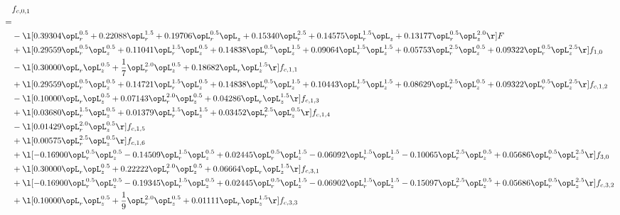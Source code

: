 \begin{alignat}{2} 
\label{eq:f_01_2} 
& f_{c,0,1} \nonumber \\ 
 = \\ 
& - \l[  0.39304 \opL_r^{0.5} +  0.22088 \opL_r^{1.5} +  0.19706 \opL_r^{0.5} \opL_z +  0.15340 \opL_r^{2.5} +  0.14575 \opL_r^{1.5} \opL_z +  0.13177 \opL_r^{0.5} \opL_z^{2.0}  \r] F \nonumber \\ 
& + \l[  0.29559 \opL_r^{0.5} \opL_z^{0.5} +  0.11041 \opL_r^{1.5} \opL_z^{0.5} +  0.14838 \opL_r^{0.5} \opL_z^{1.5} +  0.09064 \opL_r^{1.5} \opL_z^{1.5} +  0.05753 \opL_r^{2.5} \opL_z^{0.5} +  0.09322 \opL_r^{0.5} \opL_z^{2.5}  \r] f_{1,0} \nonumber \\ 
& - \l[  0.30000 \opL_r \opL_z^{0.5} + \frac{1}{7} \opL_r^{2.0} \opL_z^{0.5} +  0.18682 \opL_r \opL_z^{1.5}  \r] f_{c,1,1} \nonumber \\ 
& + \l[  0.29559 \opL_r^{0.5} \opL_z^{0.5} +  0.14721 \opL_r^{1.5} \opL_z^{0.5} +  0.14838 \opL_r^{0.5} \opL_z^{1.5} +  0.10443 \opL_r^{1.5} \opL_z^{1.5} +  0.08629 \opL_r^{2.5} \opL_z^{0.5} +  0.09322 \opL_r^{0.5} \opL_z^{2.5}  \r] f_{c,1,2} \nonumber \\ 
& - \l[  0.10000 \opL_r \opL_z^{0.5} +  0.07143 \opL_r^{2.0} \opL_z^{0.5} +  0.04286 \opL_r \opL_z^{1.5}  \r] f_{c,1,3} \nonumber \\ 
& + \l[  0.03680 \opL_r^{1.5} \opL_z^{0.5} +  0.01379 \opL_r^{1.5} \opL_z^{1.5} +  0.03452 \opL_r^{2.5} \opL_z^{0.5}  \r] f_{c,1,4} \nonumber \\ 
& - \l[  0.01429 \opL_r^{2.0} \opL_z^{0.5}  \r] f_{c,1,5} \nonumber \\ 
& + \l[  0.00575 \opL_r^{2.5} \opL_z^{0.5}  \r] f_{c,1,6} \nonumber \\ 
& + \l[  -0.16900 \opL_r^{0.5} \opL_z^{0.5}   -0.14509 \opL_r^{1.5} \opL_z^{0.5} +  0.02445 \opL_r^{0.5} \opL_z^{1.5}   -0.06092 \opL_r^{1.5} \opL_z^{1.5}   -0.10065 \opL_r^{2.5} \opL_z^{0.5} +  0.05686 \opL_r^{0.5} \opL_z^{2.5}  \r] f_{3,0} \nonumber \\ 
& + \l[  0.30000 \opL_r \opL_z^{0.5} +  0.22222 \opL_r^{2.0} \opL_z^{0.5} +  0.06664 \opL_r \opL_z^{1.5}  \r] f_{c,3,1} \nonumber \\ 
& + \l[  -0.16900 \opL_r^{0.5} \opL_z^{0.5}   -0.19345 \opL_r^{1.5} \opL_z^{0.5} +  0.02445 \opL_r^{0.5} \opL_z^{1.5}   -0.06902 \opL_r^{1.5} \opL_z^{1.5}   -0.15097 \opL_r^{2.5} \opL_z^{0.5} +  0.05686 \opL_r^{0.5} \opL_z^{2.5}  \r] f_{c,3,2} \nonumber \\ 
& + \l[  0.10000 \opL_r \opL_z^{0.5} + \frac{1}{9} \opL_r^{2.0} \opL_z^{0.5} +  0.01111 \opL_r \opL_z^{1.5}  \r] f_{c,3,3} \nonumber \\ 

\end{alignat}
